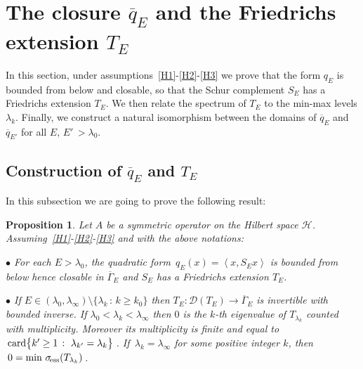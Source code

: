 \documentclass[12pt,reqno]{amsart}
\newtheorem{proposition}[theorem]{Proposition}
\newcommand{\innerproduct}[2]{\left\langle #1, #2 \right\rangle}
\renewcommand{\(}{\left(}
\renewcommand{\)}{\right)}
\begin{document}
\section{The closure \texorpdfstring{$\overline{q}_E$}{qE} and the Friedrichs extension \texorpdfstring{$T_E$}{TE}}\label{bounded-below}

 In this section, under assumptions~\eqref{H1}-\eqref{H2}-\eqref{H3} we prove that the form $q_E$ is bounded from below and closable, so that the Schur complement $S_E$ has a Friedrichs extension $T_E$. We then relate the spectrum of $T_E$ to the min-max levels $\lambda_k$. Finally, we construct a natural isomorphism between the domains of $\overline{q}_E$ and $\overline{q}_{E'}$ for all $E,\,E'\,>\lambda_0$.
 
 \subsection{Construction of \texorpdfstring{$\overline{q}_E$}{qE} and \texorpdfstring{$T_E$}{TE}}\label{bounded-from-below}
 
 In this subsection we are going to prove the following result:
 \begin{proposition}\label{Prop:thm1-abis} Let $A$ be a symmetric operator on the Hilbert space $\mathcal H$. Assuming~\eqref{H1}-\eqref{H2}-\eqref{H3} and with the above notations:
 
 $\bullet$ For each $E>\lambda_0$, the quadratic form~$q_E(x)=\innerproduct{x}{S_E x}$ is bounded from below hence closable in $\overline \Gamma_E$ and $S_E$ has a Friedrichs extension $T_E$.
 
 $\bullet$ If $E\in (\lambda_0,\lambda_\infty)\setminus\{\lambda_k\,:\, k\geq k_0\}$ then $T_E:\mathcal D(T_E)\to \overline{\Gamma}_E$ is invertible with bounded inverse. If $\lambda_0<\lambda_k<\lambda_\infty$ then $0$ is the $k$-th eigenvalue of $T_{\lambda_k}$ counted with multiplicity. Moreover its multiplicity is finite and equal to $\,{\rm card} \bigl\{ k'
\ge 1 \,:\, \,\lambda_{k'} = \lambda_k \bigr\} \,$.
If $\,\lambda_k=\lambda_\infty$ for some positive integer $k$, then $\,0=\min\,\sigma_{\!\rm ess}(T_{\lambda_k})\,$.\end{proposition}
\end{document}
